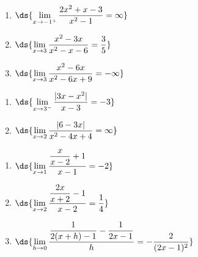 \documentclass{ximera}
\begin{document}
\begin{enumerate}
\setcounter{enumi}{\value{HW}}

\item   $\ds{\lim_{x \rightarrow -1^{+}} \dfrac{2x^2+x-3}{x^2-1} = \infty}$

\medskip

\item  $\ds{\lim_{x \rightarrow 3} \dfrac{x^2-3x}{x^2-x-6} = \frac{3}{5}}$


\medskip

\item  $\ds{\lim_{x \rightarrow 3} \dfrac{x^2-6x}{x^2-6x+9} = -\infty}$

\medskip

\setcounter{HW}{\value{enumi}}
\end{enumerate}




\begin{enumerate}
\setcounter{enumi}{\value{HW}}

\item  $\ds{ \lim_{x \rightarrow 3^{-}} \dfrac{|3x - x^2| }{x-3} = -3}$ 

\medskip    

\item $\ds{\lim_{x \rightarrow 2} \dfrac{|6-3x|}{x^2-4x+4} = \infty}$

\medskip

\setcounter{HW}{\value{enumi}}
\end{enumerate}

\begin{enumerate}
\setcounter{enumi}{\value{HW}}

\item  $\ds{\lim_{x \rightarrow 1} \dfrac{\dfrac{x}{x-2} +1}{x-1} = -2}$

\medskip

\item $\ds{ \lim_{x \rightarrow 2} \dfrac{\dfrac{2x}{x+2}  -1}{x-2}  = \frac{1}{4}}$ 

\medskip
     
\item $\ds{ \lim_{h \rightarrow 0} \dfrac{\dfrac{1}{2(x+h) - 1}  - \dfrac{1}{2x-1} }{h} = -\frac{2}{(2x-1)^2} }$ 

\medskip

\setcounter{HW}{\value{enumi}}
\end{enumerate}
\end{document}
